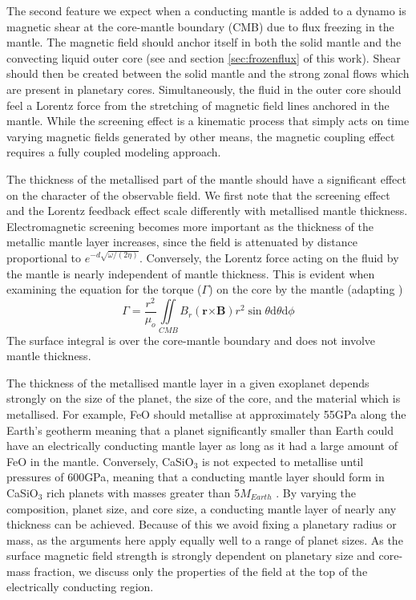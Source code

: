 The second feature we expect when a conducting mantle is added to a dynamo is magnetic shear at the core-mantle boundary (CMB) due to flux freezing in the mantle. The magnetic field should anchor itself in both the solid mantle and the convecting liquid outer core (see \citet{moffatt1978} and section \ref{sec:frozenflux} of this work). Shear should then be created between the solid mantle and the strong zonal flows which are present in planetary cores. Simultaneously, the fluid in the outer core should feel a Lorentz force from the stretching of magnetic field lines anchored in the mantle. While the screening effect is a kinematic process that simply acts on time varying magnetic fields generated by other means, the magnetic coupling effect requires a fully coupled modeling approach.

The thickness of the metallised part of the mantle should have a significant effect on the character of the observable field. We first note that the screening effect and the Lorentz feedback effect scale differently with metallised mantle thickness. Electromagnetic screening becomes more important as the thickness of the metallic mantle layer increases, since the field is attenuated by distance proportional to $e^{-d\sqrt{\omega/(2 \eta)}}$. Conversely, the Lorentz force acting on the fluid by the mantle is nearly independent of mantle thickness. This is evident when examining the equation for the torque ($\Gamma$) on the core by the mantle (adapting \citep{gubbins1987})
\begin{equation}
\Gamma=\frac{r^{2}}{\mu_{o}}\iint\limits_{CMB}B_r\left(\mathbf{r}\mathbf{\mathbf{\times}}\mathbf{B}\right)r^{2} \sin\theta \mathrm{d}\theta \mathrm{d}\phi
\end{equation}
The surface integral is over the core-mantle boundary and does not involve mantle thickness. 

The thickness of the metallised mantle layer in a given exoplanet depends strongly on the size of the planet, the size of the core, and the material which is metallised. For example, FeO should metallise at approximately 55GPa along the Earth's geotherm \citep{ohta2012} meaning that a planet significantly smaller than Earth could have an electrically conducting mantle layer as long as it had a large amount of FeO in the mantle. Conversely, CaSiO$_{3}$ is not expected to metallise until pressures of 600GPa, meaning that a conducting mantle layer should form in CaSiO$_{3}$ rich planets with masses greater than 5$M_{Earth}$ \citep{tsuchiya2011}. By varying the composition, planet size, and core size, a conducting mantle layer of nearly any thickness can be achieved. Because of this we avoid fixing a planetary radius or mass, as the arguments here apply equally well to a range of planet sizes. As the surface magnetic field strength is strongly dependent on planetary size and core-mass fraction, we discuss only the properties of the field at the top of the electrically conducting region.
 
